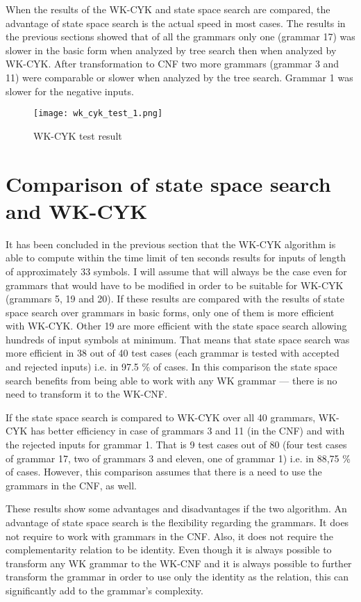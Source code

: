 When the results of the WK-CYK and state space search are compared, the advantage of state space search is the actual speed in most cases. The results in the previous sections showed that of all the grammars only one (grammar 17) was slower in the basic form when analyzed by tree search then when analyzed by WK-CYK. After transformation to CNF two more grammars (grammar 3 and 11) were comparable or slower when analyzed by the tree search. Grammar 1 was slower for the negative inputs.

\begin{figure}[h!]
  \centering
  \texttt{[image: wk\_cyk\_test\_1.png]}
  \caption{WK-CYK test result}
  \label{fig:wk_cyk_test1}
\end{figure}

\section{Comparison of state space search and WK-CYK}

It has been concluded in the previous section that the WK-CYK algorithm is able to compute within the time limit of ten seconds results for inputs of length of approximately 33 symbols. I will assume that will always be the case even for grammars that would have to be modified in order to be suitable for WK-CYK (grammars 5, 19 and 20). If these results are compared with the results of state space search over grammars in basic forms, only one of them is more efficient with WK-CYK. Other 19 are more efficient with the state space search allowing hundreds of input symbols at minimum. That means that state space search was more efficient in 38 out of 40 test cases (each grammar is tested with accepted and rejected inputs) i.e. in 97.5 \% of cases. In this comparison the state space search benefits from being able to work with any WK grammar --- there is no need to transform it to the WK-CNF.

If the state space search is compared to WK-CYK over all 40 grammars, WK-CYK has better efficiency in case of grammars 3 and 11 (in the CNF) and with the rejected inputs for grammar 1. That is 9 test cases out of 80 (four test cases of grammar 17, two of grammars 3 and eleven, one of grammar 1) i.e. in 88,75 \% of cases. However, this comparison assumes that there is a need to use the grammars in the CNF, as well.

These results show some advantages and disadvantages if the two algorithm. An advantage of state space search is the flexibility regarding the grammars. It does not require to work with grammars in the CNF. Also, it does not require the complementarity relation to be identity. Even though it is always possible to transform any WK grammar to the WK-CNF and it is always possible to further transform the grammar in order to use only the identity as the relation, this can significantly add to the grammar's complexity.

